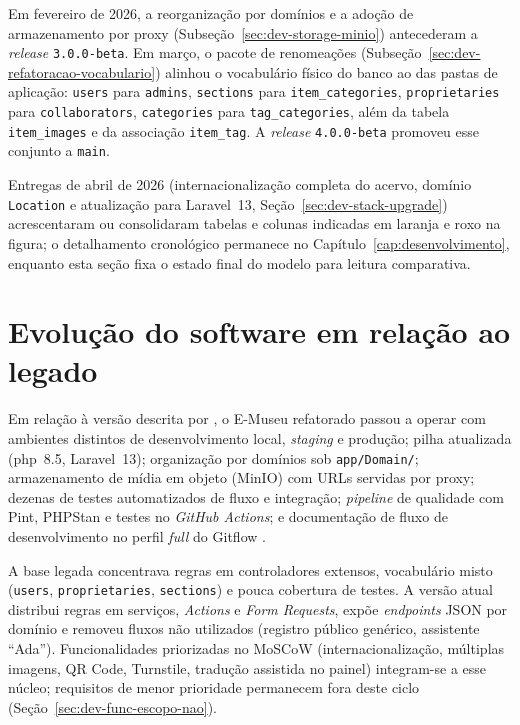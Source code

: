 Em fevereiro de 2026, a reorganização por domínios e a adoção de armazenamento por proxy (Subseção~\ref{sec:dev-storage-minio}) antecederam a \textit{release} \texttt{3.0.0-beta}. Em março, o pacote de renomeações (Subseção~\ref{sec:dev-refatoracao-vocabulario}) alinhou o vocabulário físico do banco ao das pastas de aplicação: \texttt{users} para \texttt{admins}, \texttt{sections} para \texttt{item\_categories}, \texttt{proprietaries} para \texttt{collaborators}, \texttt{categories} para \texttt{tag\_categories}, além da tabela \texttt{item\_images} e da associação \texttt{item\_tag}. A \textit{release} \texttt{4.0.0-beta} promoveu esse conjunto a \texttt{main}.

Entregas de abril de 2026 (internacionalização completa do acervo, domínio \texttt{Location} e atualização para Laravel~13, Seção~\ref{sec:dev-stack-upgrade}) acrescentaram ou consolidaram tabelas e colunas indicadas em laranja e roxo na figura; o detalhamento cronológico permanece no Capítulo~\ref{cap:desenvolvimento}, enquanto esta seção fixa o estado final do modelo para leitura comparativa.


\section{Evolução do software em relação ao legado}\label{sec:resultados-evolucao-software}

Em relação à versão descrita por , o E-Museu refatorado passou a operar com ambientes distintos de desenvolvimento local, \textit{staging} e produção; pilha atualizada (\acrshort{php}~8.5, Laravel~13); organização por domínios sob \texttt{app/Domain/}; armazenamento de mídia em objeto (MinIO) com URLs servidas por proxy; dezenas de testes automatizados de fluxo e integração; \textit{pipeline} de qualidade com Pint, PHPStan e testes no \textit{GitHub Actions}; e documentação de fluxo de desenvolvimento no perfil \textit{full} do Gitflow \cite{gitflowdoc}.

A base legada concentrava regras em controladores extensos, vocabulário misto (\texttt{users}, \texttt{proprietaries}, \texttt{sections}) e pouca cobertura de testes. A versão atual distribui regras em serviços, \textit{Actions} e \textit{Form Requests}, expõe \textit{endpoints} JSON por domínio e removeu fluxos não utilizados (registro público genérico, assistente ``Ada''). Funcionalidades priorizadas no MoSCoW (internacionalização, múltiplas imagens, QR Code, Turnstile, tradução assistida no painel) integram-se a esse núcleo; requisitos de menor prioridade permanecem fora deste ciclo (Seção~\ref{sec:dev-func-escopo-nao}).


